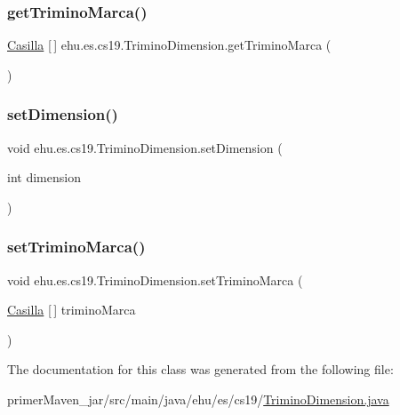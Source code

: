 \mbox{\label{classehu_1_1es_1_1cs19_1_1_trimino_dimension_ab118d4a9c1c1083603ff3077f7ecbfd1}} 
\subsubsection{\texorpdfstring{getTriminoMarca()}{getTriminoMarca()}}
{\footnotesize\ttfamily \mbox{\hyperlink{classehu_1_1es_1_1cs19_1_1_casilla}{Casilla}} \mbox{[}$\,$\mbox{]} ehu.\+es.\+cs19.\+Trimino\+Dimension.\+get\+Trimino\+Marca (\begin{DoxyParamCaption}{ }\end{DoxyParamCaption})}

\mbox{\label{classehu_1_1es_1_1cs19_1_1_trimino_dimension_a92ff7c07e131101fc275ca7b1b92d0d1}} 
\subsubsection{\texorpdfstring{setDimension()}{setDimension()}}
{\footnotesize\ttfamily void ehu.\+es.\+cs19.\+Trimino\+Dimension.\+set\+Dimension (\begin{DoxyParamCaption}\item[{int}]{dimension }\end{DoxyParamCaption})}

\mbox{\label{classehu_1_1es_1_1cs19_1_1_trimino_dimension_aaeade544742af28d18c2ff5cf2b6018f}} 
\subsubsection{\texorpdfstring{setTriminoMarca()}{setTriminoMarca()}}
{\footnotesize\ttfamily void ehu.\+es.\+cs19.\+Trimino\+Dimension.\+set\+Trimino\+Marca (\begin{DoxyParamCaption}\item[{\mbox{\hyperlink{classehu_1_1es_1_1cs19_1_1_casilla}{Casilla}} \mbox{[}$\,$\mbox{]}}]{trimino\+Marca }\end{DoxyParamCaption})}



The documentation for this class was generated from the following file\+:\begin{DoxyCompactItemize}
\item 
primer\+Maven\+\_\+jar/src/main/java/ehu/es/cs19/\mbox{\hyperlink{_trimino_dimension_8java}{Trimino\+Dimension.\+java}}\end{DoxyCompactItemize}
